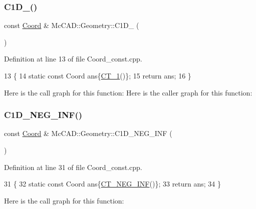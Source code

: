 \subsubsection{\texorpdfstring{C1\+D\+\_()}{C1D\_1()}}
{\footnotesize\ttfamily const \hyperlink{classMcCAD_1_1Geometry_1_1Coord}{Coord} \& Mc\+C\+A\+D\+::\+Geometry\+::\+C1\+D\+\_ (\begin{DoxyParamCaption}{ }\end{DoxyParamCaption})}



Definition at line 13 of file Coord\+\_\+const.\+cpp.


\begin{DoxyCode}
13                     \{
14     \textcolor{keyword}{static} \textcolor{keyword}{const} Coord ans\{\hyperlink{namespaceMcCAD_1_1Geometry_ad34c7456a52e2372fad7d4824eaa9e23}{CT\_1}()\};
15     \textcolor{keywordflow}{return} ans;
16 \}
\end{DoxyCode}
Here is the call graph for this function\+:
Here is the caller graph for this function\+:
\mbox{\label{namespaceMcCAD_1_1Geometry_a2704f8b3e303906d7e8928cada1c1647}} 
\subsubsection{\texorpdfstring{C1\+D\+\_\+\+N\+E\+G\+\_\+\+I\+N\+F()}{C1D\_NEG\_INF()}}
{\footnotesize\ttfamily const \hyperlink{classMcCAD_1_1Geometry_1_1Coord}{Coord} \& Mc\+C\+A\+D\+::\+Geometry\+::\+C1\+D\+\_\+\+N\+E\+G\+\_\+\+I\+NF (\begin{DoxyParamCaption}{ }\end{DoxyParamCaption})}



Definition at line 31 of file Coord\+\_\+const.\+cpp.


\begin{DoxyCode}
31                           \{
32     \textcolor{keyword}{static} \textcolor{keyword}{const} Coord ans\{\hyperlink{namespaceMcCAD_1_1Geometry_a3d66ef52d0555244290d60a8bfa6d781}{CT\_NEG\_INF}()\};
33     \textcolor{keywordflow}{return} ans;
34 \}
\end{DoxyCode}
Here is the call graph for this function\+:
\mbox{\label{namespaceMcCAD_1_1Geometry_ab581ddc27c8a6530d9c1657b77ffe0bf}} 
